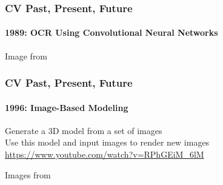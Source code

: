 \documentclass[xetex,professionalfont]{beamer}
\begin{document}

\begin{frame}
\frametitle{CV Past, Present, Future}
\framesubtitle{1989: OCR Using Convolutional Neural Networks}

\begin{center}
    {\centering Image from \cite{lecun1989}}
\end{center}

\end{frame}


\begin{frame}
\frametitle{CV Past, Present, Future}
\framesubtitle{1996: Image-Based Modeling}

Generate a 3D model from a set of images\\\medskip
Use this model and input images to render new images\\\medskip
\url{https://www.youtube.com/watch?v=RPhGEiM_6lM} %

\bigskip
\begin{center}
    {\centering Images from \cite{debevec1996}}
\end{center}

\end{frame}
\end{document}
